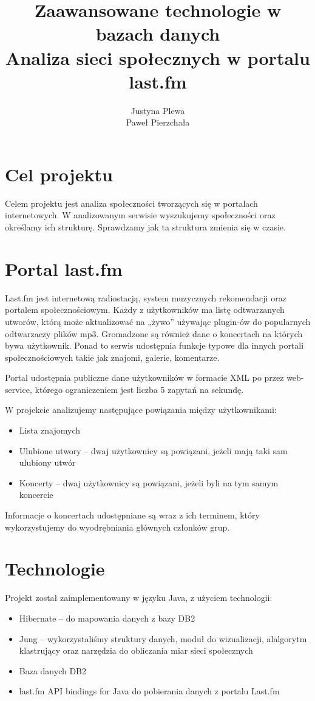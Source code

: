 \documentclass[10pt,a4paper,epic,carom]{article}
\title{Zaawansowane technologie w bazach danych\\
Analiza sieci społecznych w portalu last.fm}
\author{  Justyna Plewa \\ Paweł Pierzchała  }
\begin{document}
\maketitle



\newpage

\section {Cel projektu}
Celem projektu jest analiza społeczności tworzących się w portalach internetowych. W analizowanym serwisie wyszukujemy społeczności oraz określamy ich strukturę. Sprawdzamy jak ta struktura zmienia się w czasie.

\section {Portal last.fm}
Last.fm jest internetową radiostacją, system muzycznych rekomendacji oraz portalem społecznościowym. Każdy z użytkowników ma listę odtwarzanych utworów, którą może aktualizować na „żywo” używając plugin-ów do popularnych odtwarzaczy plików mp3. Gromadzone są również dane o koncertach na których bywa użytkownik. Ponad to serwis udostępnia funkcje typowe dla innych portali społecznościowych takie jak znajomi, galerie, komentarze.

Portal udostępnia publiczne dane użytkowników w formacie XML po przez web-service, którego ograniczeniem jest liczba 5 zapytań na sekundę.

W projekcie analizujemy następujące powiązania między użytkownikami:
\begin{itemize}
\item Lista znajomych
\item Ulubione utwory – dwaj użytkownicy są powiązani, jeżeli mają taki sam ulubiony utwór
\item Koncerty – dwaj użytkownicy są powiązani, jeżeli byli na tym samym koncercie
\end{itemize}
Informacje o koncertach udostępniane są wraz z ich terminem, który wykorzystujemy do wyodrębniania głównych członków grup.


\section {Technologie}
Projekt został zaimplementowany w języku Java, z użyciem technologii:

\begin{itemize}
\item Hibernate – do mapowania danych z bazy DB2
\item Jung – wykorzystaliśmy struktury danych, moduł do wizualizacji, alalgorytm klastrujący oraz narzędzia do obliczania miar sieci społecznych
\item Baza danych DB2
\item last.fm API bindings for Java do pobierania danych z portalu Last.fm
\end{itemize}
\end{document}
